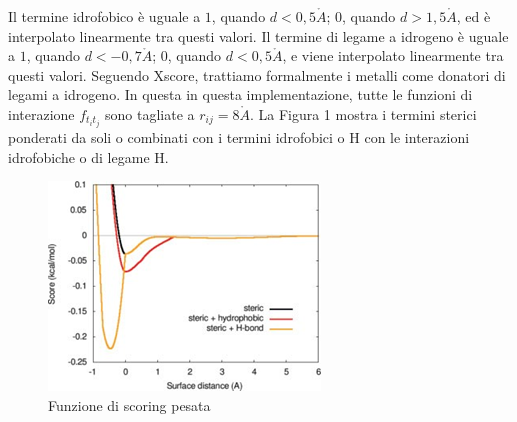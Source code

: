 Il termine idrofobico è uguale a $1$, quando $d < 0,5\mathring{A}$; $0$, quando $d > 1,5\mathring{A}$, ed è interpolato linearmente tra questi valori. Il termine di legame a idrogeno è uguale a $1$, quando $d < -0,7\mathring{A}$; $0$, quando $d < 0,5\mathring{A}$, e viene interpolato linearmente tra questi valori. Seguendo Xscore, trattiamo formalmente i metalli come donatori di legami a idrogeno. In questa in questa implementazione, tutte le funzioni di interazione $ f_{t_it_j}$ sono tagliate a $r_{ij} = 8\mathring{A}$.\newline
La Figura 1 mostra i termini sterici ponderati da soli o combinati con i termini idrofobici o H
con le interazioni idrofobiche o di legame H\cite{trott2010autodock}.

\begin{figure}[H]
    \centering
    \includegraphics{immagini/capitolo2/funzioneScoringPesata.png}
    \caption{Funzione di scoring pesata}
    \label{fig:funzione di scoring pesata}
\end{figure}

